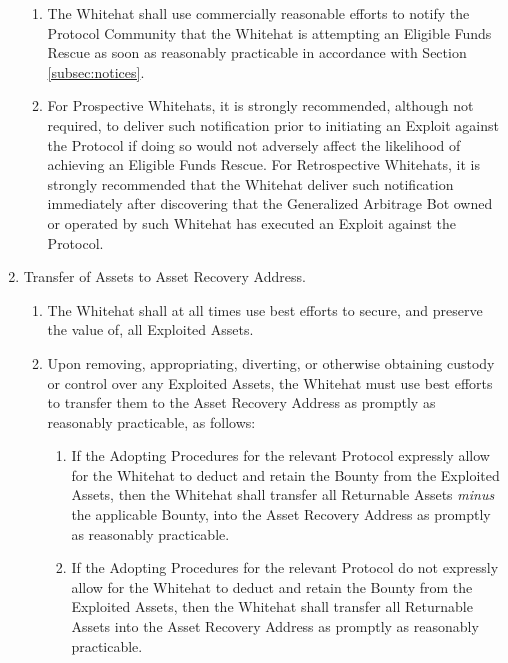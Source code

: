 \documentclass{article}
\begin{document}
\begin{enumerate}[label=\Alph*.]
          \begin{enumerate}
              \item The Whitehat shall use commercially reasonable efforts to notify the Protocol Community that the Whitehat is attempting an Eligible Funds Rescue as soon as reasonably practicable in accordance with Section \ref{subsec:notices}.

              \item For Prospective Whitehats, it is strongly recommended, although not required, to deliver such notification prior to initiating an Exploit against the Protocol if doing so would not adversely affect the likelihood of achieving an Eligible Funds Rescue. For Retrospective Whitehats, it is strongly recommended that the Whitehat deliver such notification immediately after discovering that the Generalized Arbitrage Bot owned or operated by such Whitehat has executed an Exploit against the Protocol.

          \end{enumerate}
    \item Transfer of Assets to Asset Recovery Address.\label{subsec:transfer_assets}

          \begin{enumerate}
              \item The Whitehat shall at all times use best efforts to secure, and preserve the value of, all Exploited Assets.

              \item Upon removing, appropriating, diverting, or otherwise obtaining custody or control over any Exploited Assets, the Whitehat must use best efforts to transfer them to the Asset Recovery Address as promptly as reasonably practicable, as follows:

                    \begin{enumerate}
                        \item If the Adopting Procedures for the relevant Protocol expressly allow for the Whitehat to deduct and retain the Bounty from the Exploited Assets, then the Whitehat shall transfer all Returnable Assets \textit{minus} the applicable Bounty, into the Asset Recovery Address as promptly as reasonably practicable.

                        \item If the Adopting Procedures for the relevant Protocol do not expressly allow for the Whitehat to deduct and retain the Bounty from the Exploited Assets, then the Whitehat shall transfer all Returnable Assets into the Asset Recovery Address as promptly as reasonably practicable.
                    \end{enumerate}


\end{enumerate}
\end{enumerate}
\end{document}
